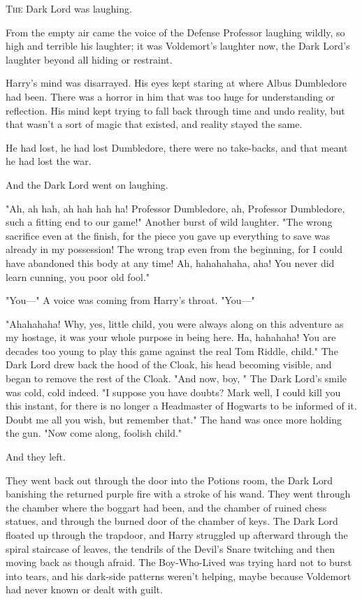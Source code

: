 
\lettrine{T}{he} Dark Lord was
laughing.

\quad\quad
From the empty air came the voice of the Defense Professor laughing wildly, so
high and terrible his laughter; it was Voldemort's laughter now, the Dark
Lord's laughter beyond all hiding or restraint.

Harry's mind was disarrayed. His eyes kept staring at where Albus Dumbledore
had been. There was a horror in him that was too huge for understanding or
reflection. His mind kept trying to fall back through time and undo reality,
but that wasn't a sort of magic that existed, and reality stayed the same.

He had lost, he had lost Dumbledore, there were no take-backs, and that meant
he had lost the war.

And the Dark Lord went on laughing.

"Ah, ah hah, ah hah hah ha! Professor Dumbledore, ah, Professor Dumbledore,
such a fitting end to our game!" Another burst of wild laughter. "The wrong
sacrifice even at the finish, for the piece you gave up everything to save was
already in my possession! The wrong trap even from the beginning, for I could
have abandoned this body at any time! Ah, hahahahaha, aha! You never did learn
cunning, you poor old fool."

"You---" A voice was coming from Harry's throat. "You---"

"Ahahahaha! Why, yes, little child, you were always along on this adventure as
my hostage, it was your whole purpose in being here. Ha, hahahaha! You are
decades too young to play this game against the real Tom Riddle, child." The
Dark Lord drew back the hood of the Cloak, his head becoming visible, and began
to remove the rest of the Cloak. "And now, boy, " The Dark Lord's smile was cold, cold indeed. "I suppose you have
doubts? Mark well, I could kill you this instant, for there is no longer a
Headmaster of Hogwarts to be informed of it. Doubt me all you wish, but
remember that." The hand was once more holding the gun. "Now come along,
foolish child."

And they left.

They went back out through the door into the Potions room, the Dark Lord
banishing the returned purple fire with a stroke of his wand. They went through
the chamber where the boggart had been, and the chamber of ruined chess
statues, and through the burned door of the chamber of keys. The Dark Lord
floated up through the trapdoor, and Harry struggled up afterward through the
spiral staircase of leaves, the tendrils of the Devil's Snare twitching and
then moving back as though afraid. The Boy-Who-Lived was trying hard not to
burst into tears, and his dark-side patterns weren't helping, maybe because
Voldemort had never known or dealt with guilt.

